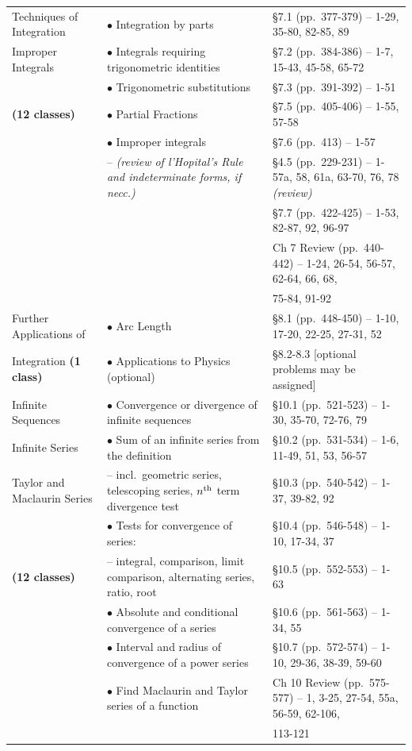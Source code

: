 \documentclass[10pt]{article}
\begin{document}
\begin{landscape}
\begin{longtable}[t]{||p{1.75in}|p{4.5in}|p{3.75in}||}
Techniques of Integration		& $\bullet$ Integration by parts			& \S 7.1 (pp.~377-379) -- 1-29, 35-80, 82-85, 89\\
Improper Integrals					& $\bullet$ Integrals requiring trigonometric identities	& \S 7.2 (pp.~384-386) -- 1-7, 15-43, 45-58, 65-72\\
					& $\bullet$ Trigonometric substitutions			& \S 7.3 (pp.~391-392) -- 1-51\\
\textbf{(12 classes)}					& $\bullet$ Partial Fractions				& \S 7.5 (pp.~405-406) -- 1-55, 57-58 \\
					& $\bullet$ Improper integrals  & \S 7.6 (pp.~413) -- 1-57 \\
					& \hspace{0.1in}-- \textit{(review of l'Hopital's Rule and indeterminate forms, if necc.)} &  \S 4.5 (pp.~229-231) -- 1-57a, 58, 61a, 63-70, 76, 78 \textit{(review)} \\
					& & \S 7.7 (pp.~422-425) -- 1-53, 82-87, 92, 96-97 \\
					& & Ch 7 Review (pp.~440-442) -- 1-24, 26-54, 56-57, 62-64, 66, 68,\\
					& & \phantom{Ch 7 Review (pp.~440-442) -- }75-84, 91-92 \\
\hline

Further Applications of & $\bullet$ Arc Length	& \S 8.1 (pp.~448-450) -- 1-10, 17-20, 22-25, 27-31, 52\\
Integration \textbf{(1 class)}					& $\bullet$ Applications to Physics (optional)	& \S 8.2-8.3 [optional problems may be assigned]\\
\hline

Infinite Sequences			& $\bullet$ Convergence or divergence of infinite sequences	& \S 10.1 (pp.~521-523) -- 1-30, 35-70, 72-76, 79 \\
Infinite Series				& $\bullet$ Sum of an infinite series from the definition	& \S 10.2 (pp.~531-534) -- 1-6, 11-49, 51, 53, 56-57 \\
Taylor and Maclaurin Series					& \hspace{0.1in} -- incl.~geometric series, telescoping series, $n^{\rm th}$ term divergence test	& \S 10.3 (pp.~540-542) -- 1-37, 39-82, 92 \\
					& $\bullet$ Tests for convergence of series:			& \S 10.4 (pp.~546-548) -- 1-10, 17-34, 37 \\
\textbf{(12 classes)}					&  \hspace{0.1in} -- integral, comparison, limit comparison, alternating series, ratio, root					& \S 10.5 (pp.~552-553) -- 1-63 \\
					& $\bullet$ Absolute and conditional convergence of a series		& \S 10.6 (pp.~561-563) -- 1-34, 55 \\
					& $\bullet$ Interval and radius of convergence of a power series		& \S 10.7 (pp.~572-574) -- 1-10, 29-36, 38-39, 59-60 \\
					& $\bullet$ Find Maclaurin and Taylor series of a function	& Ch 10 Review (pp.~575-577) -- 1, 3-25, 27-54, 55a, 56-59, 62-106,  \\
					& 	& \phantom{Ch 0 Review (pp.~575-577) - }113-121 \\
\hline


\end{longtable}
\end{landscape}
\end{document}
